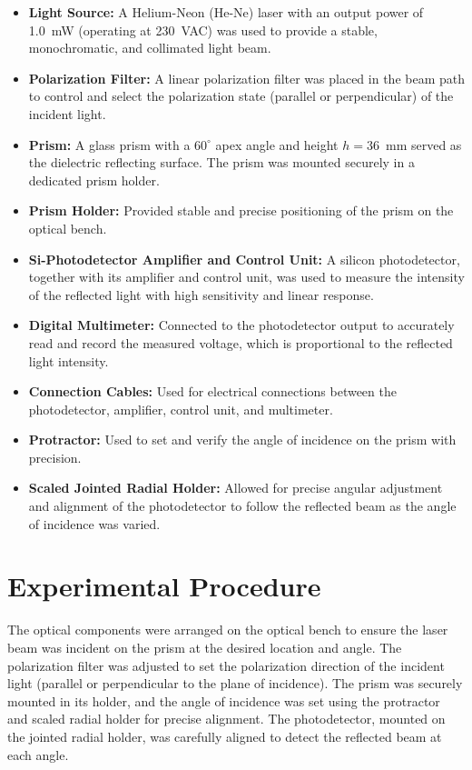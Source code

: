 \documentclass[journal]{IEEEtran}
\begin{document}
\begin{itemize}
    \item \textbf{Light Source:} A Helium-Neon (He-Ne) laser with an output power of 1.0~mW (operating at 230~VAC) was used to provide a stable, monochromatic, and collimated light beam.
    \item \textbf{Polarization Filter:} A linear polarization filter was placed in the beam path to control and select the polarization state (parallel or perpendicular) of the incident light.
    \item \textbf{Prism:} A glass prism with a $60^\circ$ apex angle and height $h = 36$~mm served as the dielectric reflecting surface. The prism was mounted securely in a dedicated prism holder.
    \item \textbf{Prism Holder:} Provided stable and precise positioning of the prism on the optical bench.
    \item \textbf{Si-Photodetector Amplifier and Control Unit:} A silicon photodetector, together with its amplifier and control unit, was used to measure the intensity of the reflected light with high sensitivity and linear response.
    \item \textbf{Digital Multimeter:} Connected to the photodetector output to accurately read and record the measured voltage, which is proportional to the reflected light intensity.
    \item \textbf{Connection Cables:} Used for electrical connections between the photodetector, amplifier, control unit, and multimeter.
    \item \textbf{Protractor:} Used to set and verify the angle of incidence on the prism with precision.
    \item \textbf{Scaled Jointed Radial Holder:} Allowed for precise angular adjustment and alignment of the photodetector to follow the reflected beam as the angle of incidence was varied.
\end{itemize}
\section{Experimental Procedure}
The optical components were arranged on the optical bench to ensure the laser beam was incident on the prism at the desired location and angle. The polarization filter was adjusted to set the polarization direction of the incident light (parallel or perpendicular to the plane of incidence). The prism was securely mounted in its holder, and the angle of incidence was set using the protractor and scaled radial holder for precise alignment. The photodetector, mounted on the jointed radial holder, was carefully aligned to detect the reflected beam at each angle.
\end{document}
